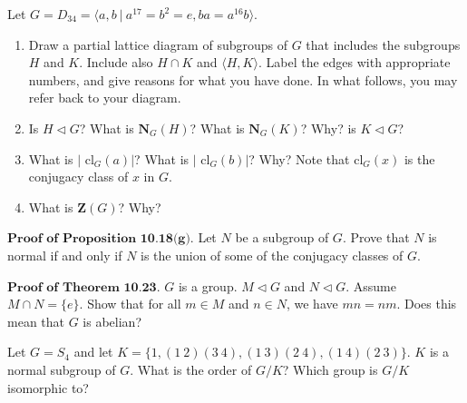 \documentclass[12pt,letterpaper,boxed]{hmcpset}
\begin{document}

\begin{problem}[10.2.11]
Let $ G = D_{34} = \langle a,b \ \vert \ a^{17} = b^2 = e, ba = a^{16}b \rangle $. 
\begin{enumerate}[label=\alph*]
\item Draw a partial lattice diagram of subgroups of $G$ that includes the subgroups $H$ and $K$. Include also $ H \cap K$ and $ \langle H,K \rangle $. Label the edges  with appropriate numbers, and give reasons for what you have done. \newline In what follows, you may refer back to your diagram. 
\item Is $ H \triangleleft G $? What is $ \textbf{N}_G(H) $? What is $ \textbf{N}_G(K) $? Why? is $ K \triangleleft G $?
\item What is $ \vert $ cl$_G(a) \vert $? What is $ \vert $ cl$_G(b) \vert$? Why? Note that cl$_G(x)$ is the conjugacy class of $x$ in $G$. 
\item What is $\textbf{Z}(G)$? Why?
\end{enumerate}
\end{problem}

\begin{solution}
\end{solution}

\clearpage

\begin{problem}[10.2.15]
$\textbf{Proof of Proposition 10.18(g).}$ Let $N$ be a subgroup of $G$. Prove that $N$ is normal if and only if $N$ is the union of some of the conjugacy classes of $G$. 
\end{problem}

\begin{solution}
\end{solution}

\clearpage

\begin{problem}[10.2.21]
$\textbf{Proof of Theorem 10.23.}$ $G$ is a group. $M \triangleleft G$ and $N \triangleleft G$. Assume $M \cap N = \{ e \}$. Show that for all $m \in M$ and $n \in N$, we have $mn = nm$. Does this mean that $G$ is abelian?
\end{problem}

\begin{solution}
\end{solution}

\clearpage

\begin{problem}[10.3.1]
Let $ G = S_4 $ and let $ K = \{ 1,(1 \ 2)(3 \ 4),(1 \ 3)(2 \ 4),(1 \ 4)(2 \ 3) \} $. $K$ is a normal subgroup of $G$. What is the order of $G/K$? Which group is $G/K$ isomorphic to? 
\end{problem}
\end{document}
